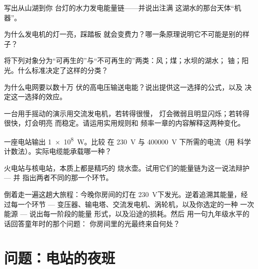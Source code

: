 \begin{exercise}[$\star$]\label{exo:g9:alternator:5}
写出从山湖到你
台灯的水力发电能量链——并说出注满
这湖水的那台天体“机器”。
\end{exercise}

\begin{exercise}[$\star$]\label{exo:g9:alternator:6}
为什么发电机的灯一亮，踩踏板
就会变费力？哪一条原理说明它不可能是别的样子？
\end{exercise}

\begin{exercise}[$\star$]\label{exo:g9:alternator:7}
将下列对象分为“可再生的”与“不可再生的”两类：风；煤；水坝的湖水；
铀；阳光。什么标准决定了这样的分类？
\end{exercise}

\begin{exercise}[$\star$]\label{exo:g9:alternator:8}
为什么电网要以数十万
伏的高电压输送电能？说出提供这一选择的公式，以及
决定这一选择的效应。
\end{exercise}

\begin{exercise}[$\star\star$]\label{exo:g9:alternator:9}
一台用手摇动的演示用交流发电机，若转得很慢，
灯会微弱且明显闪烁；若转得很快，灯会明亮
而稳定。请运用实用规则和
频率一章的内容解释这两种变化。
\end{exercise}

\begin{exercise}[$\star\star$]\label{exo:g9:alternator:10}
一座电站输出 \qty{1e8}{W}。比较
在 \qty{230}{V} 与 \qty{400000}{V} 下所需的电流（用
科学计数法）。实际电缆能承载哪一种？
\end{exercise}

\begin{exercise}[$\star\star$]\label{exo:g9:alternator:11}
火电站与核电站，本质上都是精巧的
烧水壶。试用它们的能量链为这一说法辩护 --- 并
指出两者不同的那一个环节。
\end{exercise}

\begin{exercise}[$\star\star\star$]\label{exo:g9:alternator:12}
倒着走一遍这趟大旅程：今晚你房间的灯在
\qty{230}{V}下发光。逆着追溯其能量，经过每一个环节
--- 变压器、输电塔、交流发电机、涡轮机，以及你选定的一种
一次能源 --- 说出每一阶段的能量
形式，以及沿途的损耗。然后
用一句九年级水平的话回答童年时的那个问题：
你房间里的光最终来自何处？
\end{exercise}

\section{问题：电站的夜班}

